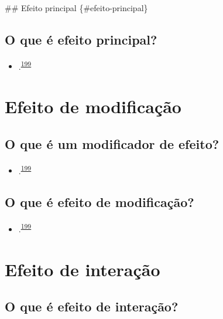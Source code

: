 \documentclass[
  a4paper,
]{book}
\providecommand{\tightlist}{%
  \setlength{\itemsep}{0pt}\setlength{\parskip}{0pt}}
\begin{document}
\#\# Efeito principal \{\#efeito-principal\}

\hypertarget{o-que-uxe9-efeito-principal}{%
\subsection{O que é efeito principal?}\label{o-que-uxe9-efeito-principal}}

\begin{itemize}
\tightlist
\item
  .\textsuperscript{\protect\hyperlink{ref-Bours2023}{199}}
\end{itemize}

\hypertarget{modificacao}{%
\section{Efeito de modificação}\label{modificacao}}

\hypertarget{o-que-uxe9-um-modificador-de-efeito}{%
\subsection{O que é um modificador de efeito?}\label{o-que-uxe9-um-modificador-de-efeito}}

\begin{itemize}
\tightlist
\item
  .\textsuperscript{\protect\hyperlink{ref-Bours2023}{199}}
\end{itemize}

\hypertarget{o-que-uxe9-efeito-de-modificauxe7uxe3o}{%
\subsection{O que é efeito de modificação?}\label{o-que-uxe9-efeito-de-modificauxe7uxe3o}}

\begin{itemize}
\tightlist
\item
  .\textsuperscript{\protect\hyperlink{ref-Bours2023}{199}}
\end{itemize}

\hypertarget{interacao}{%
\section{Efeito de interação}\label{interacao}}

\hypertarget{o-que-uxe9-efeito-de-interauxe7uxe3o}{%
\subsection{O que é efeito de interação?}\label{o-que-uxe9-efeito-de-interauxe7uxe3o}}
\end{document}
